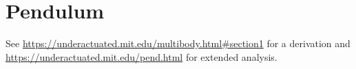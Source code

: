 \section{Pendulum}

See \url{https://underactuated.mit.edu/multibody.html#section1} for a derivation
and \url{https://underactuated.mit.edu/pend.html} for extended analysis.
